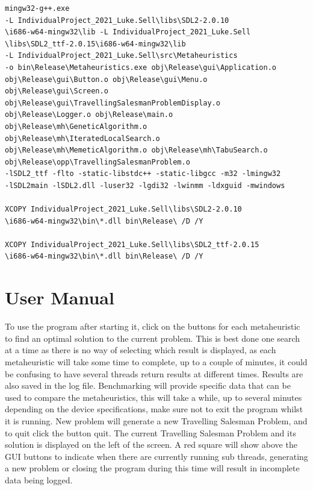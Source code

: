 \documentclass[]{final_report}
\begin{document}
\begin{verbatim}
mingw32-g++.exe
-L IndividualProject_2021_Luke.Sell\libs\SDL2-2.0.10
\i686-w64-mingw32\lib -L IndividualProject_2021_Luke.Sell
\libs\SDL2_ttf-2.0.15\i686-w64-mingw32\lib
-L IndividualProject_2021_Luke.Sell\src\Metaheuristics
-o bin\Release\Metaheuristics.exe obj\Release\gui\Application.o
obj\Release\gui\Button.o obj\Release\gui\Menu.o
obj\Release\gui\Screen.o
obj\Release\gui\TravellingSalesmanProblemDisplay.o
obj\Release\Logger.o obj\Release\main.o
obj\Release\mh\GeneticAlgorithm.o
obj\Release\mh\IteratedLocalSearch.o
obj\Release\mh\MemeticAlgorithm.o obj\Release\mh\TabuSearch.o
obj\Release\opp\TravellingSalesmanProblem.o
-lSDL2_ttf -flto -static-libstdc++ -static-libgcc -m32 -lmingw32
-lSDL2main -lSDL2.dll -luser32 -lgdi32 -lwinmm -ldxguid -mwindows

XCOPY IndividualProject_2021_Luke.Sell\libs\SDL2-2.0.10
\i686-w64-mingw32\bin\*.dll bin\Release\ /D /Y

XCOPY IndividualProject_2021_Luke.Sell\libs\SDL2_ttf-2.0.15
\i686-w64-mingw32\bin\*.dll bin\Release\ /D /Y
\end{verbatim}

\newpage
\section*{User Manual}

To use the program after starting it,
click on the buttons for each metaheuristic to find an optimal solution to the current problem.
This is best done one search at a time as there is no way of selecting which result is displayed,
as each metaheuristic will take some time to complete, up to a couple of minutes,
it could be confusing to have several threads return results at different times.
Results are also saved in the log file.
Benchmarking will provide specific data that can be used to compare the metaheuristics,
this will take a while, up to several minutes depending on the device specifications,
make sure not to exit the program whilst it is running.
New problem will generate a new Travelling Salesman Problem,
and to quit click the button quit.
The current Travelling Salesman Problem and its solution is displayed on the left of the screen.
A red square will show above the GUI buttons to indicate when there are currently running sub threads,
generating a new problem or closing the program during this time will result in incomplete data being logged.

\label{endpage}
\end{document}
